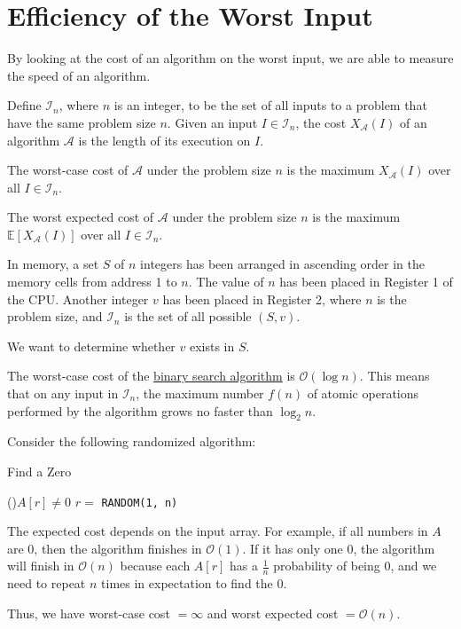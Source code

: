 \section{Efficiency of the Worst Input}
By looking at the cost of an algorithm on the worst input, we are able to measure the speed of an algorithm.

\begin{definition}
  Define \(\mathcal{I}_n\), where \(n\) is an integer, to be the set of all inputs to a problem that have the same problem size \(n\). Given an input \(I \in \mathcal{I}_n\), the cost \(X_{\mathcal{A}}(I)\) of an algorithm \(\mathcal{A}\) is the length of its execution on \(I\). 

  The worst-case cost of \(\mathcal{A}\) under the problem size \(n\) is the maximum \(X_{\mathcal{A}}(I)\) over all \(I \in \mathcal{I}_n\). 

  The worst expected cost of \(\mathcal{A}\) under the problem size \(n\) is the maximum \(\mathbb{E}[X_{\mathcal{A}}(I)]\) over all \(I \in \mathcal{I}_n\). 
\end{definition}

\begin{eg}
  In memory, a set \(S\) of \(n\) integers has been arranged in ascending order in the memory cells from address 1 to \(n\). The value of \(n\) has been placed in Register 1 of the CPU. Another integer \(v\) has been placed in Register 2, where \(n\) is the problem size, and \(\mathcal{I}_n\) is the set of all possible \((S, v)\). 

  We want to determine whether \(v\) exists in \(S\). 

  The worst-case cost of the \href{https://www.ryanc.wtf/files/CSCI2100.pdf#page=16}{binary search algorithm} is \(\mathcal{O}(\log n)\). This means that on any input in \(\mathcal{I}_n\), the maximum number \(f(n)\) of atomic operations performed by the algorithm grows no faster than \(\log_2 n\). 
\end{eg}

\begin{eg}
  Consider the following randomized algorithm: 
  
  \begin{algorithm}[H]
	\DontPrintSemicolon{}
	\caption{Find a Zero}
	\BlankLine
	\While(){\(A[r] \neq 0\)}{
		\(r = \) \texttt{RANDOM(1, n)}
	}
	\;
  \end{algorithm}

  The expected cost depends on the input array. For example, if all numbers in \(A\) are 0, then the algorithm finishes in \(\mathcal{O}(1)\). If it has only one 0, the algorithm will finish in \(\mathcal{O}(n)\) because each \(A[r]\) has a \(\frac{1}{n}\) probability of being 0, and we need to repeat \(n\) times in expectation to find the 0. 
  
  Thus, we have worst-case cost \(= \infty\) and worst expected cost \(= \mathcal{O}(n)\). 
\end{eg}

